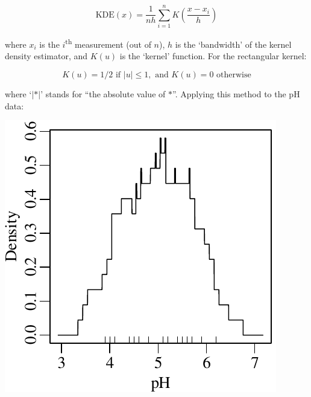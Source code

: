 \begin{equation}
  \mbox{KDE}(x) = \frac{1}{nh} \sum\limits_{i=1}^{n} K\!\left(\frac{x-x_i}{h}\right)
  \label{eq:KDE}
\end{equation}

\noindent where $x_i$ is the $i$\textsuperscript{th} measurement (out
of $n$), $h$ is the `bandwidth' of the kernel density estimator, and
$K(u)$ is the `kernel' function. For the rectangular kernel:

\begin{equation}
  K(u) = 1/2 \mbox{~if~}|u| \leq 1, \mbox{~and~} K(u) = 0 \mbox{~otherwise}
\end{equation}

\noindent where `$|\ast|$' stands for ``the absolute value of
$\ast$''. Applying this method to the pH data:

\noindent\begin{minipage}[t][][b]{.3\textwidth}
  \includegraphics[width=\textwidth]{../figures/pHrectKDE.pdf}\medskip
\end{minipage}
\begin{minipage}[t][][t]{.7\textwidth}
  \label{fig:pHrectKDE}
\end{minipage}

